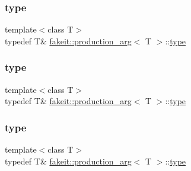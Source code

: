 \subsubsection{\texorpdfstring{type}{type}\hspace{0.1cm}{\footnotesize\ttfamily [4/9]}}
{\footnotesize\ttfamily template$<$class T$>$ \\
typedef T\& \mbox{\hyperlink{structfakeit_1_1production__arg}{fakeit\+::production\+\_\+arg}}$<$ T $>$\+::\mbox{\hyperlink{structfakeit_1_1production__arg_ade8b93fd6a2ff964755def8e4f87e69d}{type}}}

\mbox{\label{structfakeit_1_1production__arg_ade8b93fd6a2ff964755def8e4f87e69d}} 
\subsubsection{\texorpdfstring{type}{type}\hspace{0.1cm}{\footnotesize\ttfamily [5/9]}}
{\footnotesize\ttfamily template$<$class T$>$ \\
typedef T\& \mbox{\hyperlink{structfakeit_1_1production__arg}{fakeit\+::production\+\_\+arg}}$<$ T $>$\+::\mbox{\hyperlink{structfakeit_1_1production__arg_ade8b93fd6a2ff964755def8e4f87e69d}{type}}}

\mbox{\label{structfakeit_1_1production__arg_ade8b93fd6a2ff964755def8e4f87e69d}} 
\subsubsection{\texorpdfstring{type}{type}\hspace{0.1cm}{\footnotesize\ttfamily [6/9]}}
{\footnotesize\ttfamily template$<$class T$>$ \\
typedef T\& \mbox{\hyperlink{structfakeit_1_1production__arg}{fakeit\+::production\+\_\+arg}}$<$ T $>$\+::\mbox{\hyperlink{structfakeit_1_1production__arg_ade8b93fd6a2ff964755def8e4f87e69d}{type}}}

\mbox{\label{structfakeit_1_1production__arg_ade8b93fd6a2ff964755def8e4f87e69d}} 

